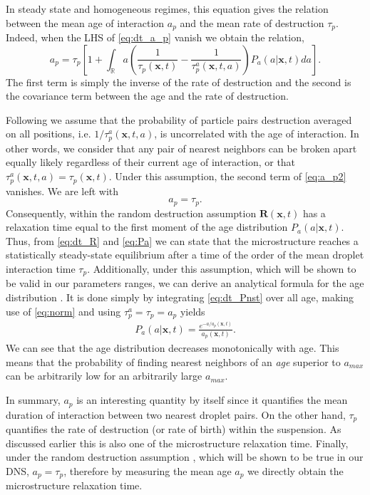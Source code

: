 In steady state and homogeneous regimes, this equation gives the relation between the mean age of interaction $a_p$ and the mean rate of destruction $\tau_p$. 
Indeed, when the LHS of \ref{eq:dt_a_p} vanish we obtain the relation,
\begin{equation}
    a_p
    = \tau_p \left[
        1
        + 
        \int_{\mathbb{R}} a\left(
            \frac{1}{\tau_p(\textbf{x},t)} 
            - \frac{1}{\tau_p^a(\textbf{x},t,a)} 
        \right) P_a(a|\textbf{x},t) da
    \right]. 
    \label{eq:a_p2}
\end{equation}
The first term is simply the inverse of the rate of destruction and the second is the covariance term between the age and the rate of destruction. 

Following \citep{zhang2023evolution} we assume that the probability of particle pairs destruction averaged on all positions, i.e. $1/\tau_p^a(\textbf{x},t,a)$, is uncorrelated with the age of interaction. 
In other words, we consider that any pair of nearest neighbors can be broken apart equally likely regardless of their current age of interaction, or that $\tau^a_p(\textbf{x},t,a) = \tau_p(\textbf{x},t)$.
Under this assumption, the second term of \ref{eq:a_p2} vanishes. 
We are left with
\begin{equation}
    a_p = \tau_p. 
    \label{eq:a_p_eq_tau_p}
\end{equation}
Consequently, within the random destruction assumption $\textbf{R}(\textbf{x},t)$ has a relaxation time equal to the first moment of the age distribution $P_a(a|\textbf{x},t)$. 
Thus, from \ref{eq:dt_R} and \ref{eq:Pa} we can state that the microstructure reaches a statistically steady-state equilibrium after a time of the order of the mean droplet interaction time $\tau_p$. 
Additionally,  under this assumption, which will be shown to be valid in our parameters ranges, we can derive an analytical formula for the age distribution \citep{zhang2023evolution}. 
It is done simply by integrating \ref{eq:dt_Pnst} over all age, making use of \ref{eq:norm} and using $\tau_p^a = \tau_p = a_p$ yields
\begin{align}
    P_a(a|\textbf{x},t)  
    =\frac{e^{-a/a_p(\textbf{x},t)}}{a_p(\textbf{x},t)}.
    \label{eq:Pa}
\end{align} 
We can see that the age distribution decreases monotonically with age. 
This means that the probability of finding nearest neighbors of an \textit{age} superior to $a_{max}$ can be arbitrarily low for an arbitrarily large $a_{max}$. 

In summary, $a_p$ is an interesting quantity by itself since it quantifies the mean duration of interaction between two nearest droplet pairs.
On the other hand, $\tau_p$ quantifies the rate of destruction (or rate of birth) within the suspension.
As discussed earlier this is also one of the microstructure relaxation time. 
Finally, under the random destruction assumption \citep{zhang2023evolution}, which will be shown to be true in our DNS, $a_p  =\tau_p$, therefore by measuring the mean age $a_p$ we directly obtain the microstructure relaxation time. 
 
